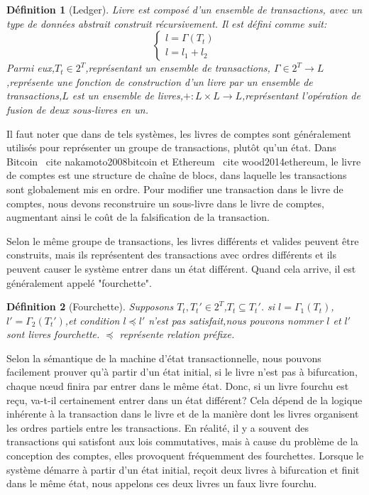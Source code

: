\documentclass[UTF8,nofonts]{article}
\newtheorem{definition}{Définition}[section]
\begin{document}
\begin{multicols}{2}
\begin{definition}[Ledger] \label{def:livre}
Livre est composé d'un ensemble de transactions, avec un type de données abstrait construit récursivement. Il est défini comme suit:
$$
\left\{\begin{matrix}
l = \Gamma(T_{t})\\ 
l = l_{1} + l_{2}
\end{matrix}\right.
$$
Parmi eux,$T_{t} \in 2^{T}$,représentant un ensemble de transactions, $\Gamma \in 2^{T} \rightarrow L$,représente une fonction de construction d'un livre par un ensemble de transactions,$L$  est un ensemble de livres,$\boldsymbol{+}: L \times L \rightarrow L$,représentant l'opération de fusion de deux sous-livres en un.
\end{definition}

Il faut noter que dans de tels systèmes, les livres de comptes sont généralement utilisés pour représenter un groupe de transactions, plutôt qu'un état. Dans Bitcoin \ cite {nakamoto2008bitcoin} et Ethereum \ cite {wood2014ethereum}, le livre de comptes est une structure de chaîne de blocs, dans laquelle les transactions sont globalement mis en ordre. Pour modifier une transaction dans le livre de comptes, nous devons reconstruire un sous-livre dans le livre de comptes, augmentant ainsi le coût de la falsification de la transaction.

Selon le même groupe de transactions, les livres différents et valides peuvent être construits, mais ils représentent des transactions avec ordres différents et ils peuvent causer le système entrer dans un état différent. Quand cela arrive, il est généralement appelé "fourchette".
\begin{definition}[Fourchette] \label{def:fourchette}
Supposons $T_{t},{T_{t}}' \in 2^{T}$,$T_{t} \subseteq {T_{t}}'$. si $l=\Gamma_{1}(T_{t})$,${l}'= \Gamma_{2}({T_{t}}')$,et condition $l \preceq {l}'$ n'est pas satisfait,nous pouvons nommer $l$ et ${l}'$ sont livres fourchette. $\preceq$ représente relation préfixe.
\end{definition}

Selon la sémantique de la machine d'état transactionnelle, nous pouvons facilement prouver qu'à partir d'un état initial, si le livre n'est pas à bifurcation, chaque nœud finira par entrer dans le même état. Donc, si un livre fourchu est reçu, va-t-il certainement entrer dans un état différent? Cela dépend de la logique inhérente à la transaction dans le livre et de la manière dont les livres organisent les ordres partiels entre les transactions. En réalité, il y a souvent des transactions qui satisfont aux lois commutatives, mais à cause du problème de la conception des comptes, elles provoquent fréquemment des fourchettes. Lorsque le système démarre à partir d'un état initial, reçoit deux livres à bifurcation et finit dans le même état, nous appelons ces deux livres un faux livre fourchu.


\end{multicols}
\end{document}
